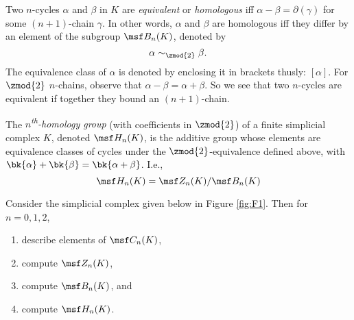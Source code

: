 \begin{definition}
  Two $n$-cycles $\alpha$ and $\beta$ in $K$ are \emph{equivalent} or
  \emph{homologous} iff $\alpha-\beta = \partial(\gamma)$ for some $(n+1)$-chain
  $\gamma$. In other words, $\alpha$ and $\beta$ are homologous iff they differ
  by an element of the subgroup $\msf B_n(K)$, denoted by
  \[
    \alpha \sim_{\zmod{2}} \beta.
  \]
  The equivalence class of $\alpha$ is denoted by enclosing it in brackets
  thusly: $[\alpha]$. For $\zmod{2}$ $n$-chains, observe that $\alpha - \beta =
  \alpha + \beta$. So we see that two $n$-cycles are equivalent if together they
  bound an $(n+1)$-chain.
\end{definition}
\begin{definition}
  The \emph{$n$\textsuperscript{th}-homology group} (with coefficients in
  $\zmod{2}$) of a finite simplicial complex $K$, denoted $\msf H_n(K)$, is the
  additive group whose elements are equivalence classes of cycles under the
  $\zmod{2}$-equivalence defined above, with $\bk{\alpha} + \bk{\beta} =
  \bk{\alpha +\beta}$. I.e.,
  \[
    \msf H_n(K) = \msf Z_n(K)/\msf B_n(K)
  \]
\end{definition}
\begin{problem}[F1]
  Consider the simplicial complex given below in Figure \ref{fig:F1}. Then for
  $n = 0, 1, 2$,
  \begin{enumerate}
    \item describe elements of $\msf C_n(K)$,
    \item compute $\msf Z_n(K)$,
    \item compute $\msf B_n(K)$, and
    \item compute $\msf H_n(K)$.
  \end{enumerate}
\end{problem}
